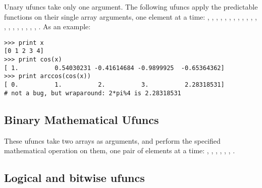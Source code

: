 Unary ufuncs take only one argument.  The following ufuncs apply the
predictable functions on their single array arguments, one element at a time:
, , , ,
, , , ,
, , , ,
, , , ,
, , , ,
.  As an example:
\begin{verbatim}
>>> print x
[0 1 2 3 4]
>>> print cos(x)
[ 1.          0.54030231 -0.41614684 -0.9899925  -0.65364362]
>>> print arccos(cos(x))
[ 0.          1.          2.          3.          2.28318531]
# not a bug, but wraparound: 2*pi%4 is 2.28318531
\end{verbatim}


\subsection{Binary Mathematical Ufuncs}
\label{sec:binary-math-ufuncs}

These ufuncs take two arrays as arguments, and perform the specified
mathematical operation on them, one pair of elements at a time: ,
, , ,
, , .


\subsection{Logical and bitwise ufuncs}
\label{sec:logical-ufuncs}

